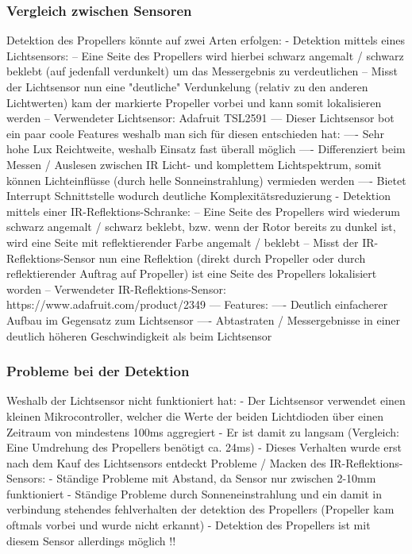 \subsubsection*{Vergleich zwischen Sensoren}
Detektion des Propellers könnte auf zwei Arten erfolgen:
- Detektion mittels eines Lichtsensors:
-- Eine Seite des Propellers wird hierbei schwarz angemalt / schwarz beklebt (auf jedenfall verdunkelt) um das Messergebnis zu verdeutlichen
-- Misst der Lichtsensor nun eine "deutliche" Verdunkelung (relativ zu den anderen Lichtwerten) kam der markierte Propeller vorbei und kann somit lokalisieren werden
-- Verwendeter Lichtsensor: Adafruit TSL2591
--- Dieser Lichtsensor bot ein paar coole Features weshalb man sich für diesen entschieden hat:
---- Sehr hohe Lux Reichtweite, weshalb Einsatz fast überall möglich
---- Differenziert beim Messen / Auslesen zwischen IR Licht- und komplettem Lichtspektrum, somit können Lichteinflüsse (durch helle Sonneinstrahlung) vermieden werden
---- Bietet Interrupt Schnittstelle wodurch deutliche Komplexitätsreduzierung
- Detektion mittels einer IR-Reflektions-Schranke:
-- Eine Seite des Propellers wird wiederum schwarz angemalt / schwarz beklebt, bzw. wenn der Rotor bereits zu dunkel ist, wird eine Seite mit reflektierender Farbe angemalt / beklebt
-- Misst der IR-Reflektions-Sensor nun eine Reflektion (direkt durch Propeller oder durch reflektierender Auftrag auf Propeller) ist eine Seite des Propellers lokalisiert worden
-- Verwendeter IR-Reflektions-Sensor: https://www.adafruit.com/product/2349
--- Features:
---- Deutlich einfacherer Aufbau im Gegensatz zum Lichtsensor
---- Abtastraten / Messergebnisse in einer deutlich höheren Geschwindigkeit als beim Lichtsensor

\subsubsection*{Probleme bei der Detektion}
Weshalb der Lichtsensor nicht funktioniert hat:
- Der Lichtsensor verwendet einen kleinen Mikrocontroller, welcher die Werte der beiden Lichtdioden über einen Zeitraum von mindestens 100ms aggregiert
- Er ist damit zu langsam (Vergleich: Eine Umdrehung des Propellers benötigt ca. 24ms)
- Dieses Verhalten wurde erst nach dem Kauf des Lichtsensors entdeckt
Probleme / Macken des IR-Reflektions-Sensors:
- Ständige Probleme mit Abstand, da Sensor nur zwischen 2-10mm funktioniert
- Ständige Probleme durch Sonneneinstrahlung und ein damit in verbindung stehendes fehlverhalten der detektion des Propellers (Propeller kam oftmals vorbei und wurde nicht erkannt)
- Detektion des Propellers ist mit diesem Sensor allerdings möglich !!

